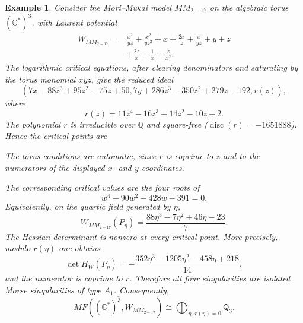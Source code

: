 \documentclass[11pt]{amsart}
\newtheorem{example}{Example}[section]
\newcommand{\MorseCat}[1]{\mathsf{Q}_{#1}}
\newcommand{\fitdisplay}[1]{%
  \begin{center}%
  \resizebox{\textwidth}{!}{$\displaystyle #1$}%
  \end{center}%
}
\begin{document}
\begin{example}
Consider the Mori--Mukai model $MM_{2-17}$ on the algebraic torus
$(\mathbb{C}^*)^3$, with Laurent potential
\begin{align*}
W_{MM_{2-17}}={}&\frac{x^2}{yz}+\frac{x^2}{yz^2}+x+\frac{2x}{z}
+\frac{x}{yz}+y+z \\
&+\frac{2z}{x}+\frac{1}{x}+\frac{z}{x^2}.
\end{align*}
The logarithmic critical equations, after clearing denominators and saturating
by the torus monomial $xyz$, give the reduced ideal
\[
\left(
7x-88z^3+95z^2-75z+50,
7y+286z^3-350z^2+279z-192,
r(z)
\right),
\]
where
\[
r(z)=11z^4-16z^3+14z^2-10z+2.
\]
The polynomial $r$ is irreducible over $\mathbb{Q}$ and square-free
($\operatorname{disc}(r)=-1651888$). Hence the critical points are
\fitdisplay{P_{\eta}=\left(
\frac{88\eta^3-95\eta^2+75\eta-50}{7},
\frac{-286\eta^3+350\eta^2-279\eta+192}{7},
\eta
\right),
\qquad
r(\eta)=0}
The torus conditions are automatic, since $r$ is coprime to $z$ and to the
numerators of the displayed $x$- and $y$-coordinates.

The corresponding critical values are the four roots of
\[
w^4-90w^2-428w-391=0.
\]
Equivalently, on the quartic field generated by $\eta$,
\[
W_{MM_{2-17}}(P_{\eta})
=\frac{88\eta^3-7\eta^2+46\eta-23}{7}.
\]
The Hessian determinant is nonzero at every critical point. More precisely,
modulo $r(\eta)$ one obtains
\[
\det H_W(P_{\eta})
=-\frac{352\eta^3-1205\eta^2-458\eta+218}{14},
\]
and the numerator is coprime to $r$. Therefore all four singularities are
isolated Morse singularities of type $A_1$. Consequently,
\[
\overline{MF((\mathbb{C}^*)^3,W_{MM_{2-17}})}
\cong \bigoplus_{\eta:\,r(\eta)=0}\MorseCat{3}.
\]
\end{example}
\end{document}
